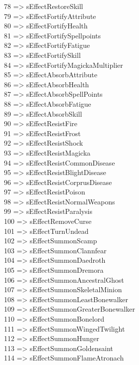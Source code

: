 78 => sEffectRestoreSkill\\
79 => sEffectFortifyAttribute\\
80 => sEffectFortifyHealth\\
81 => sEffectFortifySpellpoints\\
82 => sEffectFortifyFatigue\\
83 => sEffectFortifySkill\\
84 => sEffectFortifyMagickaMultiplier\\
85 => sEffectAbsorbAttribute\\
86 => sEffectAbsorbHealth\\
87 => sEffectAbsorbSpellPoints\\
88 => sEffectAbsorbFatigue\\
89 => sEffectAbsorbSkill\\
90 => sEffectResistFire\\
91 => sEffectResistFrost\\
92 => sEffectResistShock\\
93 => sEffectResistMagicka\\
94 => sEffectResistCommonDisease\\
95 => sEffectResistBlightDisease\\
96 => sEffectResistCorprusDisease\\
97 => sEffectResistPoison\\
98 => sEffectResistNormalWeapons\\
99 => sEffectResistParalysis\\
100 => sEffectRemoveCurse\\
101 => sEffectTurnUndead\\
102 => sEffectSummonScamp\\
103 => sEffectSummonClannfear\\
104 => sEffectSummonDaedroth\\
105 => sEffectSummonDremora\\
106 => sEffectSummonAncestralGhost\\
107 => sEffectSummonSkeletalMinion\\
108 => sEffectSummonLeastBonewalker\\
109 => sEffectSummonGreaterBonewalker\\
110 => sEffectSummonBonelord\\
111 => sEffectSummonWingedTwilight\\
112 => sEffectSummonHunger\\
113 => sEffectSummonGoldensaint\\
114 => sEffectSummonFlameAtronach\\
